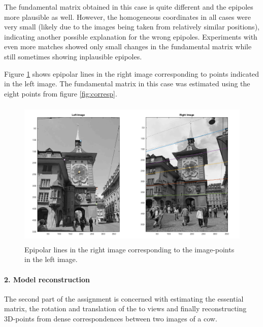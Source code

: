 \documentclass{paper}
\begin{document}
The fundamental matrix obtained in this case is quite different and the epipoles more plausible as well. However, the homogeneous coordinates in all cases were very small (likely due to the images being taken from relatively similar positions), indicating another possible explanation for the wrong epipoles. Experiments with even more matches showed only small changes in the fundamental matrix while still sometimes showing inplausible epipoles.

Figure \ref{fig:epilines} shows epipolar lines in the right image corresponding to points indicated in the left image. The fundamental matrix in this case was estimated using the eight points from figure \ref{fig:corresp}.

\begin{figure}[h!]
   \centering
   \includegraphics[height=2.8in]{epilines}
        \caption{Epipolar lines in the right image corresponding to the image-points in the left image.}
\label{fig:epilines}
\end{figure}


\paragraph{2. Model reconstruction}
The second part of the assignment is concerned with estimating the essential matrix, the rotation and translation of  the to views and finally reconstructing 3D-points from dense correspondences between two images of a cow.
\end{document}
